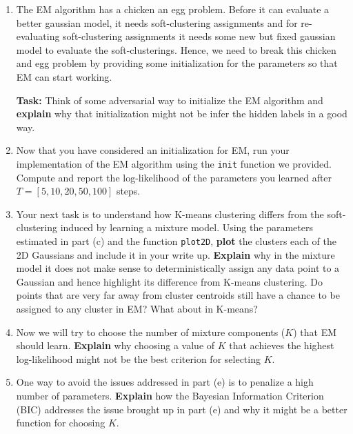 \begin{enumerate}
\begin{enumerate}
\item {} The EM algorithm has a chicken an egg problem. Before it can evaluate a better gaussian model, it needs soft-clustering assignments and for re-evaluating soft-clustering assignments it needs some new but fixed gaussian model to evaluate the soft-clusterings. Hence, we need to break this chicken and egg problem by providing some initialization for the parameters so that EM can start working.

	\textbf{Task:} Think of some adversarial way to initialize the EM algorithm and \textbf{explain} why that initialization might not be infer the hidden labels in a good way.

\item Now that you have considered an initialization for EM, run your implementation of the EM algorithm using the \texttt{init} function we provided. Compute and report the log-likelihood of the parameters you learned after $T=[5, 10, 20, 50, 100]$ steps.

\item Your next task is to understand how K-means clustering differs from the soft-clustering induced by learning a mixture model. Using the parameters estimated in part (c) and the function \texttt{plot2D}, \textbf{plot} the clusters each of the 2D Gaussians and include it in your write up. \textbf{Explain} why in the mixture model it does not make sense to deterministically assign any data point to a Gaussian and hence highlight its difference from K-means clustering. Do points that are very far away from cluster centroids still have a chance to be assigned to any cluster in EM? What about in K-means?

\item Now we will try to choose the number of mixture components ($K$) that EM should learn. \textbf{Explain} why choosing a value of $K$ that achieves the highest log-likelihood might not be the best criterion for selecting $K$.

\item One way to avoid the issues addressed in part (e) is to penalize a high number of parameters. \textbf{Explain} how the Bayesian Information Criterion (BIC) addresses the issue brought up in part (e) and why it might be a better function for choosing $K$.


\end{enumerate}
\end{enumerate}

